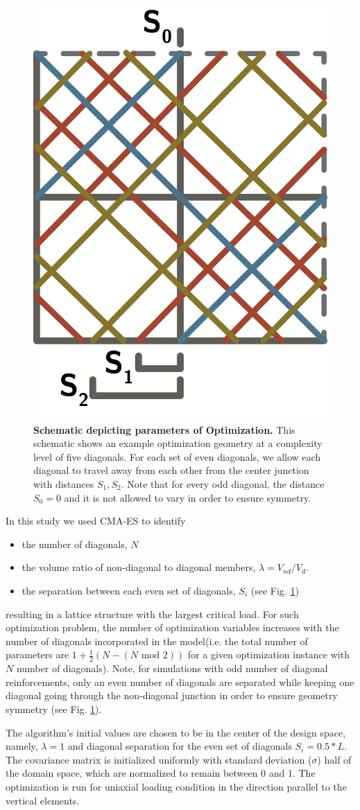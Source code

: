 \documentclass[10pt,twoside]{fernandes_supp}
\begin{document}
\begin{figure}
	\centering
	\includegraphics[width=0.2\linewidth]{SFig11.png}
	\caption{{\bf Schematic depicting parameters of Optimization.} This schematic shows an example optimization geometry  at a complexity level of five diagonals. For each set of even diagonals, we allow each diagonal to travel away from each other from the center junction with distances $S_1,S_2$. Note that for every odd diagonal, the distance $S_0=0$ and it is not allowed to vary in order to ensure symmetry.}
	\label{OptimizationSchematic}
\end{figure}

In this study we used CMA-ES to identify \begin{itemize} 
\item the number of diagonals, $N$
\item the volume ratio  of non-diagonal to diagonal members, $\lambda=V_{nd}/V_{d}$.
\item  the separation between each even set of diagonals, $S_i$ (see Fig. \ref{OptimizationSchematic})
\end{itemize}
resulting in a lattice structure with the largest critical load. For such optimization problem, the number of optimization variables increases with the number of diagonals incorporated in the model(i.e. the total number of parameters are $1+ \frac{1}{2}(N - (N \text{ mod } 2))$ for a given optimization instance with $N$ number of diagonals).  Note, for simulations with odd number of diagonal reinforcements, only an even number of diagonals are separated while keeping one diagonal going through the non-diagonal junction in order to ensure geometry symmetry (see Fig. \ref{OptimizationSchematic}). 

The algorithm's initial values are chosen to be in the center of the design space, namely, $\lambda=1$ and diagonal separation for the even set of diagonals $S_i=0.5*L$. The covariance matrix is initialized uniformly with standard deviation ($\sigma$) half of the domain space, which are normalized to remain between 0 and 1. The optimization is run for uniaxial loading condition in the direction parallel to the vertical elements. 
\end{document}

